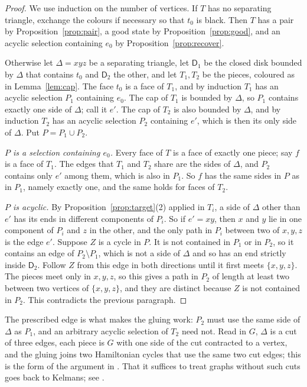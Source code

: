 \documentclass[10pt]{amsart}
\numberwithin{equation}{section}
\theoremstyle{definition}
\theoremstyle{remark}
\newcommand{\T}{T}
\begin{document}
\begin{proof}
We use induction on the number of vertices.
If $\T$ has no separating triangle, exchange the colours if necessary so that $t_0$ is black.
Then $\T$ has a pair by Proposition~\ref{prop:pair}, a good state by Proposition~\ref{prop:good}, and an acyclic selection containing $e_0$ by Proposition~\ref{prop:recover}.

Otherwise let $\Delta=xyz$ be a separating triangle, let $\mathsf{D}_1$ be the closed disk bounded by $\Delta$ that contains $t_0$ and $\mathsf{D}_2$ the other, and let $\T_1,\T_2$ be the pieces, coloured as in Lemma~\ref{lem:cap}.
The face $t_0$ is a face of $\T_1$, and by induction $\T_1$ has an acyclic selection $P_1$ containing $e_0$.
The cap of $\T_1$ is bounded by $\Delta$, so $P_1$ contains exactly one side of $\Delta$; call it $e'$.
The cap of $\T_2$ is also bounded by $\Delta$, and by induction $\T_2$ has an acyclic selection $P_2$ containing $e'$, which is then its only side of $\Delta$.
Put $P=P_1\cup P_2$.

\emph{$P$ is a selection containing $e_0$.}
Every face of $\T$ is a face of exactly one piece; say $f$ is a face of $\T_1$.
The edges that $\T_1$ and $\T_2$ share are the sides of $\Delta$, and $P_2$ contains only $e'$ among them, which is also in $P_1$.
So $f$ has the same sides in $P$ as in $P_1$, namely exactly one, and the same holds for faces of $\T_2$.

\emph{$P$ is acyclic.}
By Proposition~\ref{prop:target}(2) applied in $\T_i$, a side of $\Delta$ other than $e'$ has its ends in different components of $P_i$.
So if $e'=xy$, then $x$ and $y$ lie in one component of $P_i$ and $z$ in the other, and the only path in $P_i$ between two of $x,y,z$ is the edge $e'$.
Suppose $Z$ is a cycle in $P$.
It is not contained in $P_1$ or in $P_2$, so it contains an edge of $P_2\setminus P_1$, which is not a side of $\Delta$ and so has an end strictly inside $\mathsf{D}_2$.
Follow $Z$ from this edge in both directions until it first meets $\{x,y,z\}$.
The pieces meet only in $x,y,z$, so this gives a path in $P_2$ of length at least two between two vertices of $\{x,y,z\}$, and they are distinct because $Z$ is not contained in $P_2$.
This contradicts the previous paragraph.
\end{proof}

The prescribed edge is what makes the gluing work: $P_2$ must use the same side of $\Delta$ as $P_1$, and an arbitrary acyclic selection of $\T_2$ need not.
Read in $G$, $\Delta$ is a cut of three edges, each piece is $G$ with one side of the cut contracted to a vertex, and the gluing joins two Hamiltonian cycles that use the same two cut edges; this is the form of the argument in \cite[Appendix~C]{li2026}.
That it suffices to treat graphs without such cuts goes back to Kelmans; see \cite[Section~5]{apsw2016}.
\end{document}

